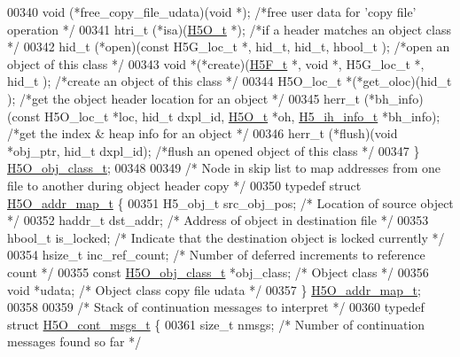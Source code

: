 \begin{DoxyCode}
00340     void    (*free\_copy\_file\_udata)(\textcolor{keywordtype}{void} *); \textcolor{comment}{/*free user data for 'copy file' operation */}
00341     htri\_t  (*isa)(\hyperlink{struct_h5_o__t}{H5O\_t} *);       \textcolor{comment}{/*if a header matches an object class */}
00342     hid\_t   (*open)(\textcolor{keyword}{const} H5G\_loc\_t *, hid\_t, hid\_t, hbool\_t ); \textcolor{comment}{/*open an object of this class */}
00343     \textcolor{keywordtype}{void}    *(*create)(\hyperlink{struct_h5_f__t}{H5F\_t} *, \textcolor{keywordtype}{void} *, H5G\_loc\_t *, hid\_t );  \textcolor{comment}{/*create an object of this class */}
00344     H5O\_loc\_t   *(*get\_oloc)(hid\_t );       \textcolor{comment}{/*get the object header location for an object */}
00345     herr\_t      (*bh\_info)(\textcolor{keyword}{const} H5O\_loc\_t *loc, hid\_t dxpl\_id, \hyperlink{struct_h5_o__t}{H5O\_t} *oh, 
      \hyperlink{struct_h5__ih__info__t}{H5\_ih\_info\_t} *bh\_info); \textcolor{comment}{/*get the index & heap info for an object */}
00346     herr\_t      (*flush)(\textcolor{keywordtype}{void} *obj\_ptr, hid\_t dxpl\_id); \textcolor{comment}{/*flush an opened object of this class */}
00347 \} \hyperlink{struct_h5_o__obj__class__t}{H5O\_obj\_class\_t};
00348 
00349 \textcolor{comment}{/* Node in skip list to map addresses from one file to another during object header copy */}
00350 \textcolor{keyword}{typedef} \textcolor{keyword}{struct }\hyperlink{struct_h5_o__addr__map__t}{H5O\_addr\_map\_t} \{
00351     H5\_obj\_t    src\_obj\_pos;            \textcolor{comment}{/* Location of source object */}
00352     haddr\_t     dst\_addr;               \textcolor{comment}{/* Address of object in destination file */}
00353     hbool\_t     is\_locked;              \textcolor{comment}{/* Indicate that the destination object is locked currently */}
00354     hsize\_t     inc\_ref\_count;          \textcolor{comment}{/* Number of deferred increments to reference count */}
00355     \textcolor{keyword}{const} \hyperlink{struct_h5_o__obj__class__t}{H5O\_obj\_class\_t} *obj\_class;   \textcolor{comment}{/* Object class */}
00356     \textcolor{keywordtype}{void}        *udata;                 \textcolor{comment}{/* Object class copy file udata */}
00357 \} \hyperlink{struct_h5_o__addr__map__t}{H5O\_addr\_map\_t};
00358 
00359 \textcolor{comment}{/* Stack of continuation messages to interpret */}
00360 \textcolor{keyword}{typedef} \textcolor{keyword}{struct }\hyperlink{struct_h5_o__cont__msgs__t}{H5O\_cont\_msgs\_t} \{
00361     \textcolor{keywordtype}{size\_t}      nmsgs;                  \textcolor{comment}{/* Number of continuation messages found so far */}

\end{DoxyCode}
